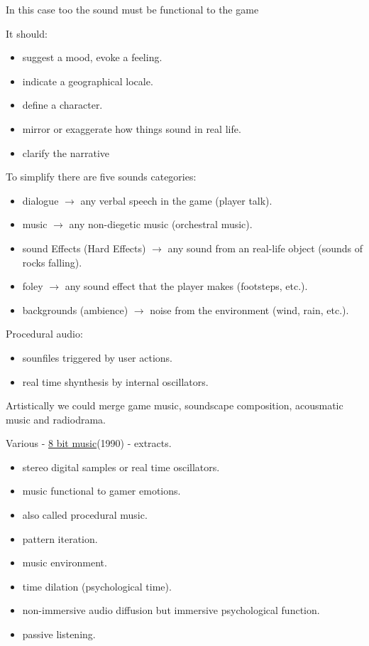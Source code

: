 In this case too the sound must be functional to the game

It should:

\begin{itemize}
\tightlist
\item suggest a mood, evoke a feeling.
\item indicate a geographical locale.
\item define a character.
\item mirror or exaggerate how things sound in real life.
\item clarify the narrative
\end{itemize}

To simplify there are five sounds categories:

\begin{itemize}
\tightlist
\item dialogue \(\rightarrow\) any verbal speech in the game (player talk).
\item music \(\rightarrow\) any non-diegetic music (orchestral music).
\item sound Effects (Hard Effects) \(\rightarrow\) any sound from an real-life object (sounds of rocks falling).
\item foley \(\rightarrow\) any sound effect that the player makes (footsteps, etc.).
\item backgrounds (ambience) \(\rightarrow\) noise from the environment (wind, rain, etc.).
\end{itemize}

Procedural audio:

\begin{itemize}
\tightlist
\item sounfiles triggered by user actions.
\item real time shynthesis by internal oscillators.
\end{itemize}

Artistically we could merge game music, soundscape composition, acousmatic music and radiodrama.

Various - \href{http://www.musicaecodice.it/gitmedia/emc/2_media/gaming.mp3}{8 bit music}(1990) - extracts.

\begin{itemize}
\tightlist
\item stereo digital samples or real time oscillators.
\item music functional to gamer emotions.
\item also called procedural music.
\item pattern iteration.
\item music environment.
\item time dilation (psychological time).
\item non-immersive audio diffusion but immersive psychological function.
\item passive listening.
\end{itemize}

